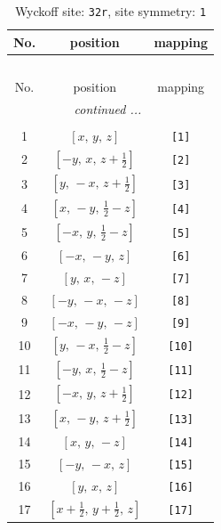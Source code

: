 \documentclass[fleqn,8pt]{jsarticle}
\begin{document}
\renewcommand{\arraystretch}{1.2}
\begin{longtable}{ccc}
\caption{Wyckoff site: {\tt 32r}, site symmetry: {\tt 1}}
 \\
 \hline \hline
No. & position & mapping \\ \hline \endfirsthead

\multicolumn{2}{l}{\tablename\ \thetable{}} \\
 \hline \hline
No. & position & mapping \\ \hline \endhead

 \hline \hline
\multicolumn{2}{r}{\footnotesize\it continued ...} \\ \endfoot

 \hline \hline
\multicolumn{2}{r}{} \\ \endlastfoot

1 & $\left[ x,\, y,\, z \right]$ & {\tt [1]} \\ \hline
2 & $\left[ - y,\, x,\, z + \frac{1}{2} \right]$ & {\tt [2]} \\ \hline
3 & $\left[ y,\, - x,\, z + \frac{1}{2} \right]$ & {\tt [3]} \\ \hline
4 & $\left[ x,\, - y,\, \frac{1}{2} - z \right]$ & {\tt [4]} \\ \hline
5 & $\left[ - x,\, y,\, \frac{1}{2} - z \right]$ & {\tt [5]} \\ \hline
6 & $\left[ - x,\, - y,\, z \right]$ & {\tt [6]} \\ \hline
7 & $\left[ y,\, x,\, - z \right]$ & {\tt [7]} \\ \hline
8 & $\left[ - y,\, - x,\, - z \right]$ & {\tt [8]} \\ \hline
9 & $\left[ - x,\, - y,\, - z \right]$ & {\tt [9]} \\ \hline
10 & $\left[ y,\, - x,\, \frac{1}{2} - z \right]$ & {\tt [10]} \\ \hline
11 & $\left[ - y,\, x,\, \frac{1}{2} - z \right]$ & {\tt [11]} \\ \hline
12 & $\left[ - x,\, y,\, z + \frac{1}{2} \right]$ & {\tt [12]} \\ \hline
13 & $\left[ x,\, - y,\, z + \frac{1}{2} \right]$ & {\tt [13]} \\ \hline
14 & $\left[ x,\, y,\, - z \right]$ & {\tt [14]} \\ \hline
15 & $\left[ - y,\, - x,\, z \right]$ & {\tt [15]} \\ \hline
16 & $\left[ y,\, x,\, z \right]$ & {\tt [16]} \\ \hline
17 & $\left[ x + \frac{1}{2},\, y + \frac{1}{2},\, z \right]$ & {\tt [17]} \\ \hline

\end{longtable}
\end{document}

